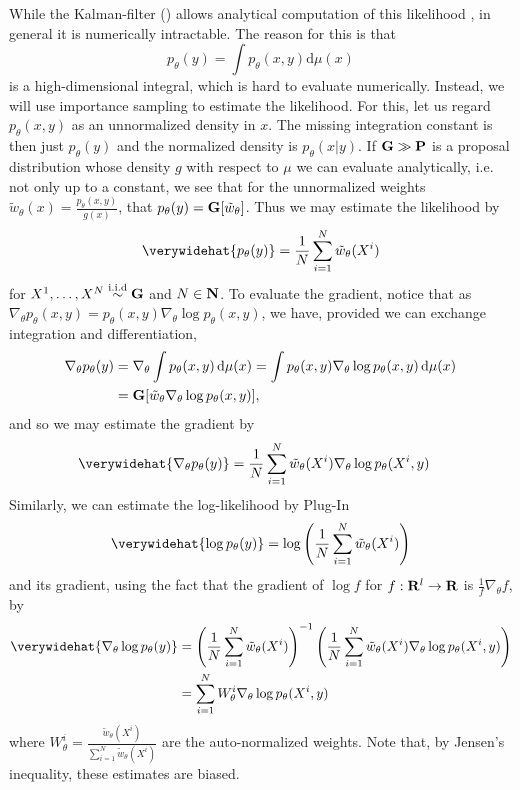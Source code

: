 While the Kalman-filter () allows analytical computation of this likelihood , in general  it is numerically intractable. The reason for this is that
$$
    p_{\theta}(y) = \int p_{\theta}(x,y) \mathrm d \mu(x)
$$
is a high-dimensional integral, which is hard to evaluate numerically. Instead, we will use importance sampling to estimate the likelihood. For this, let us regard $p_{\theta}(x,y)$ as an unnormalized density in $x$. The missing integration constant is then just $p_{\theta}(y)$ and the normalized density is $p_{\theta}(x|y)$. If $\mathbf G \gg \mathbf P$ is a proposal distribution whose density $g$ with respect to $\mu$ we can evaluate analytically, i.e. not only up to a constant, we see that for the unnormalized weights $\tilde w_{\theta}(x) = \frac{p_{\theta}(x,y)}{g(x)}$, that $p_{\theta}(y) = \mathbf G [\tilde w_{\theta}]$. Thus we may estimate the likelihood by 
$$
    \verywidehat{p_{\theta}(y)} = \frac{1}{N}\sum_{i = 1}^N \tilde w_{\theta} (X^{i})
$$
for $X^{1}, \dots, X^{N} \stackrel{\text{i.i.d}}{\sim} \mathbf G$ and $N \in \mathbf N$. To evaluate the gradient, notice that as $\nabla_{\theta} p_{\theta}(x,y) = p_{\theta}(x,y) \nabla_{\theta} \log p_{\theta}(x,y)$, we have, provided we can exchange integration and differentiation,
\begin{align*}
     \nabla_{\theta} p_{\theta}(y) &= \nabla_{\theta}\int p_{\theta}(x,y)\,\mathrm d \mu(x) = \int p_{\theta}(x,y) \nabla_{\theta} \log p_{\theta}(x,y)\,\mathrm d \mu(x) \\
     &= \mathbf G [\tilde w_{\theta} \nabla_{\theta} \log p_{\theta}(x,y)],
\end{align*}
and so we may estimate the gradient by 
\begin{align*}
    \verywidehat{\nabla_{\theta} p_{\theta}(y)} &= \frac{1}{N}\sum_{i = 1}^N \tilde w_{\theta}(X^{i}) \nabla_{\theta} \log p_{\theta}(X^{i}, y)
\end{align*}
Similarly, we can estimate the log-likelihood by Plug-In
\begin{align}
    \label{eq:loglik-hat-standard}
    \verywidehat{\log p_{\theta}(y)} = \log \left( \frac{1}{N}\sum_{i = 1}^N \tilde w_{\theta}(X^{i}) \right)
\end{align}
and its gradient, using the fact that the gradient of $\log f$ for $f: \mathbf R^{l} \to \mathbf R$ is $ \frac{1}{f} \nabla_{\theta} f$, by 
\begin{align*}
    \verywidehat{\nabla_{\theta} \log p_{\theta}(y)} &= \left(\frac{1}{N} \sum_{i = 1}^N \tilde w_{\theta}(X^{i}) \right)^{-1} \left( \frac{1}{N}\sum_{i = 1}^N \tilde w_{\theta}(X^{i}) \nabla_{\theta} \log p_{\theta}(X^{i}, y) \right) \\
    &=\sum_{i = 1}^N W_{\theta}^{i} \nabla_{\theta} \log p_{\theta}(X^{i}, y)
\end{align*}
where $W_{\theta}^{i} = \frac{\tilde w_{\theta}(X^{i})}{\sum_{i= 1}^N \tilde w_{\theta}(X^{i})}$ are the auto-normalized weights.
Note that, by Jensen's inequality, these estimates are biased.


